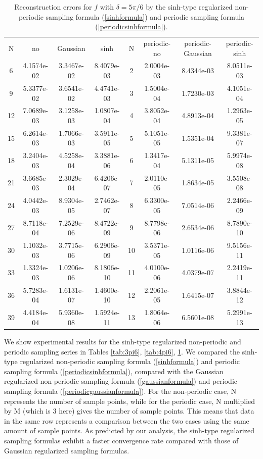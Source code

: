\documentclass[a4paper]{article}
\numberwithin{equation}{section}
\begin{document}
\begin{table}[h]
\centering
\caption{Reconstruction errors for $f$ with $\delta = 5\pi/6$ by  the sinh-type regularized non-periodic sampling formula (\ref{sinhformula}) and  periodic sampling formula (\ref{periodicsinhformula}). }
\label{tab:5pi6}
\begin{tabular}{c c c c c c c c}
\toprule
{N} & {no} & {Gaussian} & {sinh} &{N} & {periodic-no}& {periodic-Gaussian} & {periodic-sinh} \\
\cmidrule(lr){2-4} \cmidrule(lr){6-8}
6  & 4.1574e-02 & 3.3467e-02 & 8.4079e-03 & 2  & 2.0004e-03 & 8.4344e-03 & 8.0511e-03 \\
9  & 5.3377e-02 & 3.6541e-02 & 4.4741e-03 & 3  & 1.5004e-04 & 1.7230e-03 & 4.1051e-04 \\
12 & 7.0689e-03 & 3.1258e-03 & 1.0807e-04 & 4  & 3.8052e-04 & 4.8913e-04 & 1.2963e-05 \\
15 & 6.2614e-03 & 1.7066e-03 & 3.5911e-05 & 5  & 5.1051e-05 & 1.5351e-04 & 9.3381e-07 \\
18 & 3.2404e-03 & 4.5258e-04 & 3.3881e-06 & 6  & 1.3417e-04 & 5.1311e-05 & 5.9974e-08 \\
21 & 3.6685e-03 & 2.3029e-04 & 6.4206e-07 & 7  & 2.0110e-05 & 1.8634e-05 & 3.5508e-08 \\
24 & 4.0442e-03 & 8.9304e-05 & 2.7462e-07 & 8  & 6.3300e-05 & 7.0514e-06 & 2.2466e-09 \\
27 & 8.7118e-04 & 7.2529e-06 & 8.4722e-09 & 9  & 8.7798e-06 & 2.6534e-06 & 8.7890e-10 \\
30 & 1.1032e-03 & 3.7715e-06 & 6.2906e-09 & 10 & 3.5371e-05 & 1.0116e-06 & 9.5156e-11 \\
33 & 1.3324e-03 & 1.0206e-06 & 8.1806e-10 & 11 & 4.0100e-06 & 4.0379e-07 & 2.2419e-11 \\
36 & 5.7283e-04 & 1.6131e-07 & 1.4600e-10 & 12 & 2.2061e-05 & 1.6415e-07 & 3.8844e-12 \\
39 & 4.4184e-04 & 5.9360e-08 & 1.5924e-11 & 13 & 1.8064e-06 & 6.5601e-08 & 5.2991e-13 \\
\bottomrule
\end{tabular}

\end{table}

We show experimental results for the sinh-type regularized non-periodic and periodic sampling series in Tables \ref{tab:3pi6}, \ref{tab:4pi6}, \ref{tab:5pi6}. We compared the sinh-type regularized non-periodic sampling formula (\ref{sinhformula}) and  periodic sampling formula (\ref{periodicsinhformula}), compared with   the Gaussian regularized non-periodic sampling formula (\ref{gaussianformula}) and  periodic sampling formula (\ref{periodicgaussianformula}). For the non-periodic case, N represents the number of sample points, while for the periodic case, N multiplied by M (which is 3 here) gives the number of sample points. This means that data in the same row represents a comparison between the two cases using the same amount of  sample points. As predicted by our analysis,  the sinh-type regularized sampling formulas exhibit  a faster  convergence rate compared  with those of Gaussian regularized sampling formulas. 
\end{document}

